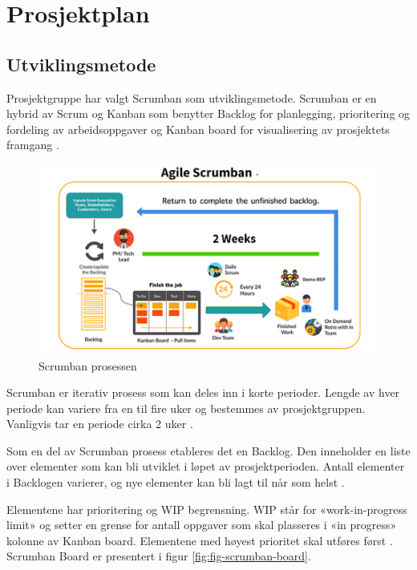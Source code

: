 \section{Prosjektplan}

\subsection{Utviklingsmetode}

Prosjektgruppe har valgt Scrumban som utviklingsmetode. Scrumban er en hybrid av Scrum og Kanban som benytter Backlog for planlegging, prioritering og fordeling av arbeidsoppgaver og Kanban board for visualisering av prosjektets framgang \cite{6-scrumban-overview}.

\begin{figure}[ht]
\centering
\includegraphics{images/fig-scrumban.png}
\caption{Scrumban prosessen \cite{6-scrumban-overview}}
\label{fig:fig-scrumban}
\end{figure}
 

Scrumban er iterativ prosess som kan deles inn i korte perioder. Lengde av hver periode kan variere fra en til fire uker og bestemmes av prosjektgruppen. Vanligvis tar en periode cirka 2 uker \cite{6-scrum-vs-kanban-vs-scrumban}.

Som en del av Scrumban prosess etableres det en Backlog. Den inneholder en liste over elementer som kan bli utviklet i løpet av prosjektperioden. Antall elementer i Backlogen varierer, og nye elementer kan bli lagt til når som helst \cite{6-scrum-vs-kanban-vs-scrumban}.

Elementene har prioritering og WIP begrensning. WIP står for «work-in-progress limit» og setter en grense for antall oppgaver som skal plasseres i «in progress» kolonne av Kanban board. Elementene med høyest prioritet skal utføres først \cite{6-scrum-vs-kanban-vs-scrumban}. Scrumban Board er presentert i figur \ref{fig:fig-scrumban-board}.

